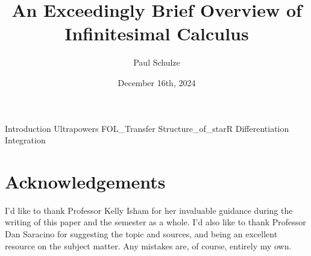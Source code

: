 \documentclass{article}
\title{An Exceedingly Brief Overview of Infinitesimal Calculus}
\author{Paul Schulze}
\date{December 16th, 2024}
\theoremstyle{definition}
\begin{document}
\maketitle

{Introduction}
{Ultrapowers}
{FOL_Transfer}
{Structure_of_starR}
{Differentiation}
{Integration}

\section*{Acknowledgements}
I'd like to thank Professor Kelly Isham for her invaluable guidance during the writing of this paper and the semester as a whole. I'd also like to thank Professor Dan Saracino for suggesting the topic and sources, and being an excellent resource on the subject matter. Any mistakes are, of course, entirely my own.
\nocite{*}
\printbibliography
\end{document}

